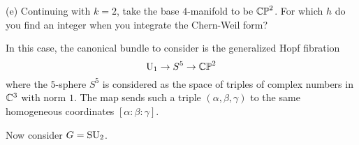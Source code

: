 \documentclass{../../templates/lkx_pset}
\begin{document}
\begin{parts}
	\begin{part}{(e)}
		Continuing with $k=2$, take the base $4$-manifold to be $\mathbb{CP}^2$. For which $h$ do you find an integer when you integrate the Chern-Weil form?
	\end{part}

	In this case, the canonical bundle to consider is the generalized Hopf fibration
	\[
		\operatorname{U}_1 \to S^5 \to \mathbb{CP}^2
	\]
	where the $5$-sphere $S^5$ is considered as the space of triples of complex numbers in $\mathbb{C}^3$ with norm $1$. The map sends such a triple $(\alpha, \beta, \gamma)$ to the same homogeneous coordinates $[\alpha:\beta:\gamma]$.

\end{parts}

\begin{problem}{3}
Now consider $G=\operatorname{SU}_2$.
\end{problem}
\end{document}
